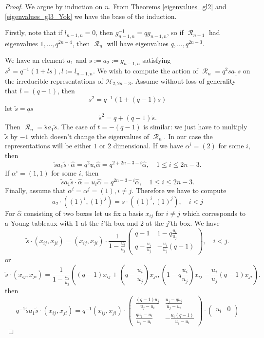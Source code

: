 \documentclass[12pt,reqno]{amsart}
\theoremstyle{definition}
\theoremstyle{remark}
\numberwithin{equation}{section}
\DeclareMathOperator{\R}{\mathcal{R}}
\begin{document}
\begin{proof}
We argue by induction on $n$. From Theorems \ref{eigenvalues_gl2} and \ref{eigenvalues_gl3_Yok} we have the base of the induction. 

Firstly, note that if $l_{n-1,n}=0$, then $g_{n-1,n}^{-1}=qg_{n-1,n}$, so if $\R_{n-1}$ had eigenvalues $1,\dots, q^{2n-4}$, then $\R_n$ will have eigenvalues $q,\dots, q^{2n-3}$.

We have an element $a_1$ and $s:=a_2:=g_{n-1,n}$ satisfying $s^2=q^{-1}(1+ls),l:=l_{n-1,n}$. We wish to compute the action of $\R_n=q^2sa_1s$ on the irreducible representations of $\mathcal{H}_{2,2n-3}$. Assume without loss of generality that $l=(q-1)$, then
\[
s^2 = q^{-1}(1+(q-1)s)
\]
let $\tilde s=qs$
\[
\tilde s^2 = q+ (q-1)\tilde s.
\]
Then $\R_n=\tilde s a_1 \tilde s$. The case of $t=-(q-1)$ is similar: we just have to multiply $\tilde s$ by $-1$ which doesn't change the eigenvalues of $\R_n$. In our case the representations will be either $1$ or $2$ dimensional. 
If we have $\alpha^i=(2)$ for some $i$, then
\[
\tilde sa_1 \tilde s \cdot \widehat\alpha=q^2u_i \widehat\alpha=q^{2+2n-3-i} \widehat\alpha, \quad 1\le i\le 2n-3.
\]
If $\alpha^i=(1,1)$ for some $i$, then
\[
\tilde sa_1 \tilde s \cdot \widehat\alpha=u_i \widehat\alpha=q^{2n-3-i}\widehat\alpha, \quad 1\le i\le 2n-3.
\]
Finally, assume that $\alpha^i=\alpha^j=(1), i\neq j$. Therefore we have to compute
\[
a_2\cdot ((1)^i,(1)^j)=s\cdot ((1)^i,(1)^j), \quad i<j
\]
For $\widehat\alpha$ consisting of two boxes let us fix a basis $x_{ij}$ for $i\neq j$ which corresponds to a Young tableaux with $1$ at the $i$'th box and $2$ at the $j$'th box. We have
\[
\tilde s\cdot (x_{ij},x_{ji})=(x_{ij},x_{ji})\cdot \frac{1}{1-\frac{u_i}{u_j}} \begin{pmatrix}
    q-1 & 1-q\frac{u_i}{u_j}\\
    q-\frac{u_i}{u_j} & -\frac{u_i}{u_j}(q-1)
\end{pmatrix}, \quad i<j.
\]
or
\[
\tilde s\cdot (x_{ij},x_{ji})=\frac{1}{1-\frac{u_i}{u_j}} ((q-1)x_{ij}+(q-\frac{u_i}{u_j})x_{ji},(1-q\frac{u_i}{u_j})x_{ij}-\frac{u_i}{u_j}(q-1)x_{ji}).
\]
then
\[
q^{-1} \tilde sa_1 \tilde s\cdot (x_{ij},x_{ji})=q^{-1}(x_{ij},x_{ji}) \cdot \begin{pmatrix}
    \frac{(q-1)u_j}{u_j-u_i} & \frac{u_j-qu_i}{u_j-u_i}\\
    \frac{qu_j-u_i}{u_j-u_i} & -\frac{u_i(q-1)}{u_j-u_i}
\end{pmatrix}
\cdot \begin{pmatrix}
    u_i & 0\\

\end{pmatrix}\]
\end{proof}
\end{document}
